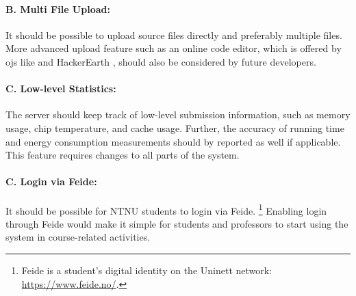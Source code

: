 \paragraph*{B. Multi File Upload:} It should be possible to upload source files directly and preferably multiple files. More advanced upload feature such as an online code editor, which is offered by \glspl{oj} like \cite{KATTIS} and HackerEarth \cite{HACKEREARTH}, should also be considered by future developers.

\paragraph*{C. Low-level Statistics:} The server should keep track of low-level submission information, such as memory usage, chip temperature, and cache usage. Further, the accuracy of running time and energy consumption measurements should by reported as well if applicable. This feature requires changes to all parts of the system.

\paragraph*{C. Login via Feide:} It should be possible for NTNU students to login via Feide. \footnote{Feide is a student's digital identity on the Uninett network: \url{https://www.feide.no/}.} Enabling login through Feide would make it simple for students and professors to start using the system in course-related activities.
